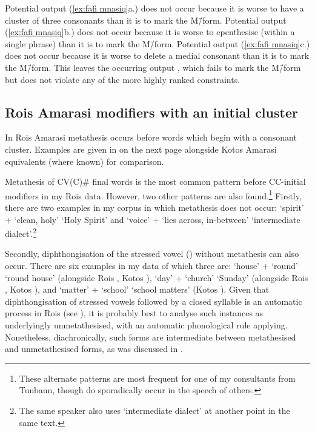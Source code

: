 Potential output (\ref{ex:fafi mnasiq}a.) 
does not occur because it is worse to have a cluster of three consonants
than it is to mark the M\=/form.
Potential output (\ref{ex:fafi mnasiq}b.) 
does not occur because it is worse to epenthesise
(within a single phrase) than it is to mark the M\=/form.
Potential output (\ref{ex:fafi mnasiq}c.) 
does not occur because it is worse to delete a medial consonant
than it is to mark the M\=/form.
This leaves the occurring output ,
which fails to mark the M\=/form but does not violate
any of the more highly ranked constraints.

\subsection{Ro{\Q}is Amarasi modifiers with an initial cluster}\label{sec:RoqAnaCCIniMod}
In Ro{\Q}is Amarasi metathesis occurs before words
which begin with a consonant cluster.
Examples are given in  on the next page
alongside Kotos Amarasi equivalents (where known) for comparison.

Metathesis of CV(C){\#} final words is the most common
pattern before CC-initial modifiers in my Ro{\Q}is data.
However, two other patterns are also found.\footnote{
		These alternate patterns are most frequent for
		one of my consultants from Tunbaun,
		though do sporadically occur in the speech of others.}
Firstly, there are two examples in my corpus in
which metathesis does not occur:
 `spirit' +  `clean, holy'
{\ra}  `Holy Spirit'
and  `voice' +  `lies across, in-between'
{\ra}  `intermediate dialect'.\footnote{
		The same speaker also uses  `intermediate dialect'
		at another point in the same text.}

Secondly, diphthongisation of the stressed vowel ()
without metathesis can also occur. There are six examples in my data
of which three are:  `house' +  `round' {\ra}
 `round house'
(alongside Ro{\Q}is , Kotos ),
 `day' +  `church' {\ra}  `Sunday'
(alongside Ro{\Q}is , Kotos ), and
 `matter' +  `school' {\ra} 
`school matters' (Kotos ).
Given that diphthongisation of stressed vowels
followed by a closed syllable is an automatic process
in Ro{\Q}is (see ),
it is probably best to analyse such instances as underlyingly
unmetathesised, with an automatic phonological rule applying.
Nonetheless, diachronically, such forms are intermediate
between metathesised and unmetathesised forms,
as was discussed in .

